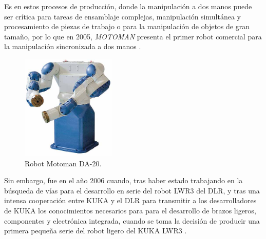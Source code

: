 \begin{itemize}
  Es en estos procesos de producción, donde la manipulación a dos manos puede ser crítica para tareas de ensamblaje complejas, manipulación simultánea
y procesamiento de piezas de trabajo o para la manipulación de objetos de gran tamaño, por lo que en 2005, \emph{MOTOMAN} presenta el primer robot comercial para la manipulación sincronizada a dos manos \cite{Siciliano16}.

  \begin{figure} [h!]
    \begin{center}
      \includegraphics[width=45mm]{figs/MOTOMAN.jpg}
    \end{center}
    \caption{Robot Motoman DA-20.}
    \label{fig:MOTOMAN}
  \end{figure}
  
  Sin embargo, fue en el año 2006 cuando, tras haber estado trabajando en la búsqueda de vías para el desarrollo en serie del robot LWR3 del DLR, y tras una intensa cooperación entre KUKA y el DLR para transmitir a los desarrolladores de KUKA los conocimientos necesarios para para el desarrollo de brazos ligeros, componentes y electrónica integrada, cuando se toma la decisión de producir una primera pequeña serie del robot ligero del KUKA LWR3 \cite{Bischoff10}.
  

\end{itemize}
